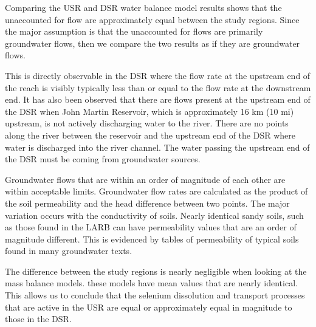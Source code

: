 \begin{linenumbers}
Comparing the USR and DSR water balance model results shows that the unaccounted for flow are approximately equal between the study regions.  Since the major assumption is that the unaccounted for flows are primarily groundwater flows, then we compare the two results as if they are groundwater flows.  

This is directly observable in the DSR where the flow rate at the upstream end of the reach is visibly typically less than or equal to the flow rate at the downstream end.  It has also been observed that there are flows present at the upstream end of the DSR when John Martin Reservoir, which is approximately 16 km (10 mi) upstream, is not actively discharging water to the river.  There are no points along the river between the reservoir and the upstream end of the DSR where water is discharged into the river channel.  The water passing the upstream end of the DSR must be coming from groundwater sources.

Groundwater flows that are within an order of magnitude of each other are within acceptable limits.  Groundwater flow rates are calculated as the product of the soil permeability and the head difference between two points.  The major variation occurs with the conductivity of soils.  Nearly identical sandy soils, such as those found in the LARB can have permeability values that are an order of magnitude different.  This is evidenced by tables of permeability of typical soils found in many groundwater texts.

The difference between the study regions is nearly negligible when looking at the mass balance models.  these models have mean values that are nearly identical.  This allows us to conclude that the selenium dissolution and transport processes that are active in the USR are equal or approximately equal in magnitude to those in the DSR.

\clearpage{}
\end{linenumbers}